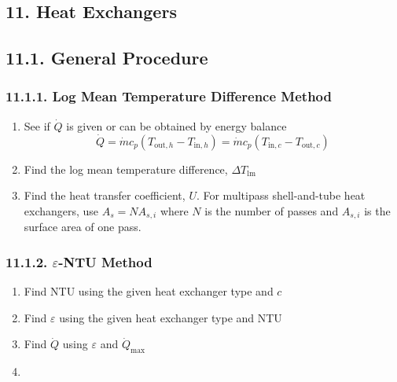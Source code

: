 \begin{multicols*}{2}
\section*{11. Heat Exchangers}
\subsection*{11.1. General Procedure}
\subsubsection*{11.1.1. Log Mean Temperature Difference Method}
\begin{enumerate}
    \item See if $\dot{Q}$ is given or can be obtained by energy balance
    \[ \dot{Q} = \dot{m} c_p (T_{\text{out},h} - T_{\text{in},h}) = \dot{m} c_p (T_{\text{in},c} - T_{\text{out},c}) \]
    \item Find the log mean temperature difference, $\Delta T_{\text{lm}}$
    \item Find the heat transfer coefficient, $U$. For multipass shell-and-tube heat exchangers, use
    $A_s = N A_{s,i}$ where $N$ is the number of passes and $A_{s,i}$ is the surface area of one pass.
\end{enumerate}
\subsubsection*{11.1.2. $\varepsilon$-NTU Method}
\begin{enumerate}
    \item Find NTU using the given heat exchanger type and $c$
    \item Find $\varepsilon$ using the given heat exchanger type and NTU
    \item Find $\dot{Q}$ using $\varepsilon$ and $\dot{Q}_{\text{max}}$
    \item 
\end{enumerate}

\end{multicols*}
